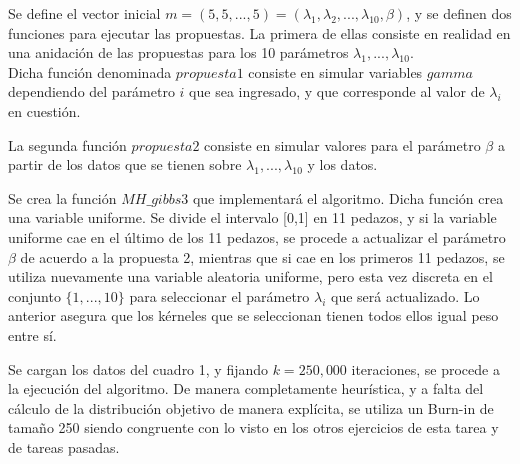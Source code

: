 \documentclass[letterpaper]{article}
\newcommand{\1}{\mathds{1}}
\theoremstyle{definition}
\theoremstyle{definition}
\theoremstyle{definition}
\theoremstyle{definition}
\theoremstyle{definition}
\begin{document}
\begin{itemize}
    Se define el vector inicial $m=(5,5,...,5)=(\lambda_1,\lambda_2,...,\lambda_{10},\beta)$, y se definen 
    dos funciones para ejecutar las propuestas. La primera de ellas consiste en realidad en una anidación de 
    las propuestas para los 10 parámetros $\lambda_1,...,\lambda_{10}$.\\

    Dicha función denominada $propuesta1$ consiste en simular variables $gamma$ dependiendo 
    del parámetro $i$ que sea ingresado, y que corresponde al valor de $\lambda_i$ en cuestión.
    \newline

    La segunda función $propuesta2$ consiste en simular valores para el parámetro $\beta$ a partir de 
    los datos que se tienen sobre $\lambda_1,...,\lambda_{10}$ y los datos.
    \newline

    Se crea la función $MH\_gibbs3$ que implementará el algoritmo. Dicha función crea una 
    variable uniforme. Se divide el intervalo [0,1] en 11 pedazos, y si la variable uniforme 
    cae en el último de los 11 pedazos, se procede a actualizar el parámetro $\beta$ de acuerdo 
    a la propuesta 2, mientras que si cae en los primeros 11 pedazos, se utiliza nuevamente 
    una variable aleatoria uniforme, pero esta vez discreta en el conjunto $\{1,...,10\}$ para 
    seleccionar el parámetro $\lambda_{i}$ que será actualizado. Lo anterior asegura que los kérneles que se seleccionan 
    tienen todos ellos igual peso entre sí.
    \newline

    Se cargan los datos del cuadro 1, y fijando $k=250,000$ iteraciones, se procede a la ejecución del algoritmo.
    De manera completamente heurística, y a falta del cálculo de la distribución objetivo de manera explícita, 
    se utiliza un Burn-in de tamaño 250 siendo congruente con lo visto en los otros ejercicios de esta tarea y de tareas 
    pasadas.\\


\end{itemize}
\end{document}
